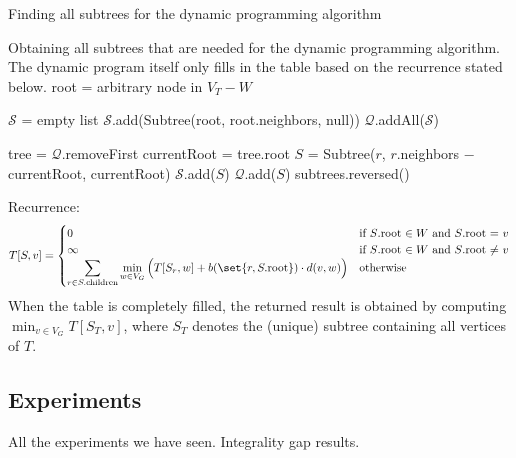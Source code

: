 \begin{algorithm}
    \caption{Finding all subtrees for the dynamic programming algorithm}
    \label{alg:idk}
    \begin{algorithmic}[1]
        \Statex Obtaining all subtrees that are needed for the dynamic programming algorithm.
        The dynamic program itself only fills in the table based on the recurrence stated below.
            \State root = arbitrary node in $V_T - W$

            \State $\mathcal S$ = empty list
            \State $\mathcal S$.add(Subtree(root, root.neighbors, null)) 
            \State $\mathcal Q$.addAll($\mathcal S$)

                \State tree = $\mathcal Q$.removeFirst
                \State currentRoot = tree.root
                    \State $S$ = Subtree($r$, $r$.neighbors $-$ currentRoot, currentRoot)
                    \State $\mathcal S$.add($S$)
                    \State $\mathcal Q$.add($S$)
                \EndFor
            \EndWhile
            \State \Return subtrees.reversed()
        \EndProcedure
    \end{algorithmic}
\end{algorithm}

Recurrence:
\[
    T[S, v] = \begin{cases}
                  0 &\text{if $S$.root $\in W$ and $S$.root = $v$} \\
                  \infty &\text{if $S$.root $\in W$ and $S$.root $\neq$ $v$} \\
                  \displaystyle \sum_{r \in S.\text{children}} \min_{w \in V_G} \Big( T[S_r, w] + b(\set{r, S.\text{root}}) \cdot d(v, w) \Big) &\text{otherwise} \\
    \end{cases}
\]
When the table is completely filled, the returned result is obtained by computing $\min_{v \in V_G} T[S_T, v]$, where $S_T$ denotes the (unique) subtree containing all vertices of $T$.

\subsection{Experiments}
All the experiments we have seen.
Integrality gap results.

